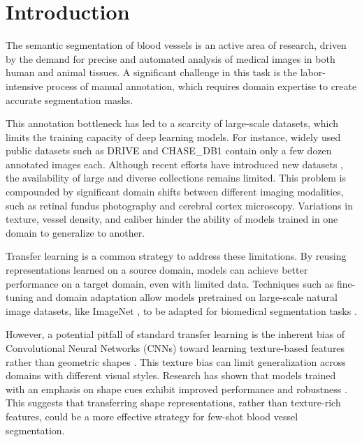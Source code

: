 \documentclass[%
reprint,
nofootinbib,
 amsmath,amssymb,
aps,
superscriptaddress,
showkeys,
longbibliography
]{revtex4-1}
\begin{document}

\maketitle
\thispagestyle{plain}

\section{Introduction}
\label{sec:introduction}

The semantic segmentation of blood vessels is an active area of research, driven by the demand for precise and automated analysis of medical images in both human and animal tissues. A significant challenge in this task is the labor-intensive process of manual annotation, which requires domain expertise to create accurate segmentation masks.

This annotation bottleneck has led to a scarcity of large-scale datasets, which limits the training capacity of deep learning models. For instance, widely used public datasets such as DRIVE \cite{Staal2004} and CHASE\_DB1 \cite{Fraz2012ensemble} contain only a few dozen annotated images each. Although recent efforts have introduced new datasets \cite{jin2022fives, fhima2024lunet}, the availability of large and diverse collections remains limited. This problem is compounded by significant domain shifts between different imaging modalities, such as retinal fundus photography and cerebral cortex microscopy. Variations in texture, vessel density, and caliber hinder the ability of models trained in one domain to generalize to another.

Transfer learning is a common strategy to address these limitations. By reusing representations learned on a source domain, models can achieve better performance on a target domain, even with limited data. Techniques such as fine-tuning and domain adaptation allow models pretrained on large-scale natural image datasets, like ImageNet \cite{JiaDeng2009}, to be adapted for biomedical segmentation tasks \cite{zoetmulderDomainTaskspecificTransfer2022}.

However, a potential pitfall of standard transfer learning is the inherent bias of Convolutional Neural Networks (CNNs) toward learning texture-based features rather than geometric shapes \cite{geirhos2018, islam2021shape}. This texture bias can limit generalization across domains with different visual styles. Research has shown that models trained with an emphasis on shape cues exhibit improved performance and robustness \cite{geirhos2018}. This suggests that transferring shape representations, rather than texture-rich features, could be a more effective strategy for few-shot blood vessel segmentation.
\end{document}
